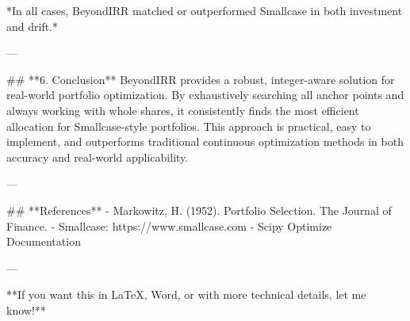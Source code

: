 *In all cases, BeyondIRR matched or outperformed Smallcase in both investment and drift.*

---

## **6. Conclusion**
BeyondIRR provides a robust, integer-aware solution for real-world portfolio optimization. By exhaustively searching all anchor points and always working with whole shares, it consistently finds the most efficient allocation for Smallcase-style portfolios. This approach is practical, easy to implement, and outperforms traditional continuous optimization methods in both accuracy and real-world applicability.

---

## **References**
- Markowitz, H. (1952). Portfolio Selection. The Journal of Finance.
- Smallcase: https://www.smallcase.com
- Scipy Optimize Documentation

---

**If you want this in LaTeX, Word, or with more technical details, let me know!**
